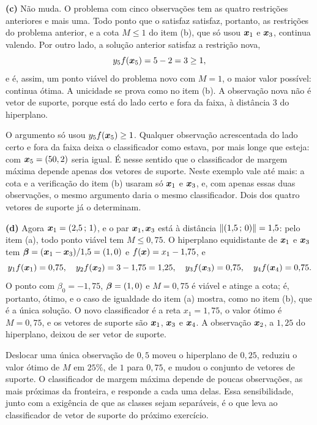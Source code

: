 \documentclass[11pt,a4paper]{article}
\begin{document}
\begin{solucao}
\smallskip
\textbf{(c)} Não muda. O problema com cinco observações tem as quatro restrições
anteriores e mais uma. Todo ponto que o satisfaz satisfaz, portanto, as restrições do
problema anterior, e a cota $M\le1$ do item (b), que só usou $\bm{x}_1$ e $\bm{x}_3$, continua
valendo. Por outro lado, a solução anterior satisfaz a restrição nova,
\[
  y_5f(\bm{x}_5)=5-2=3\ge1 ,
\]
e é, assim, um ponto viável do problema novo com $M=1$, o maior valor possível:
continua ótima. A unicidade se prova como no item (b). A observação nova não é vetor de
suporte, porque está do lado certo e fora da faixa, à distância $3$ do hiperplano.

O argumento só usou $y_5f(\bm{x}_5)\ge1$. Qualquer observação acrescentada do lado certo e
fora da faixa deixa o classificador como estava, por mais longe que esteja: com
$\bm{x}_5=(50,2)$ seria igual. É nesse sentido que o classificador de margem máxima depende
apenas dos vetores de suporte. Neste exemplo vale até mais: a cota e a verificação do
item (b) usaram só $\bm{x}_1$ e $\bm{x}_3$, e, com apenas essas duas observações, o mesmo
argumento daria o mesmo classificador. Dois dos quatro vetores de suporte já o
determinam.

\smallskip
\textbf{(d)} Agora $\bm{x}_1=(2{,}5\,;\,1)$, e o par $\bm{x}_1,\bm{x}_3$ está à distância
$\left\lVert (1{,}5\,;\,0) \right\rVert=1{,}5$: pelo item (a), todo ponto viável tem $M\le0{,}75$. O
hiperplano equidistante de $\bm{x}_1$ e $\bm{x}_3$ tem $\bm{\beta}=(\bm{x}_1-\bm{x}_3)/1{,}5=(1,0)$ e
$f(\bm{x})=x_1-1{,}75$, e
\[
  y_1f(\bm{x}_1)=0{,}75,\quad y_2f(\bm{x}_2)=3-1{,}75=1{,}25,\quad
  y_3f(\bm{x}_3)=0{,}75,\quad y_4f(\bm{x}_4)=0{,}75 .
\]
O ponto com $\beta_0=-1{,}75$, $\bm{\beta}=(1,0)$ e $M=0{,}75$ é viável e atinge a cota; é,
portanto, ótimo, e o caso de igualdade do item (a) mostra, como no item (b), que é a
única solução. O novo classificador é a reta $x_1=1{,}75$, o valor ótimo é $M=0{,}75$,
e os vetores de suporte são $\bm{x}_1$, $\bm{x}_3$ e $\bm{x}_4$. A observação $\bm{x}_2$, a $1{,}25$ do
hiperplano, deixou de ser vetor de suporte.

Deslocar uma única observação de $0{,}5$ moveu o hiperplano de $0{,}25$, reduziu o
valor ótimo de $M$ em $25\%$, de $1$ para $0{,}75$, e mudou o conjunto de vetores de
suporte. O classificador de margem máxima depende de poucas observações, as mais
próximas da fronteira, e responde a cada uma delas. Essa sensibilidade, junto com a
exigência de que as classes sejam separáveis, é o que leva ao classificador de vetor de
suporte do próximo exercício.
\end{solucao}
\end{document}
